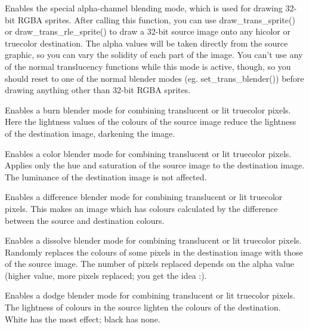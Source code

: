 Enables the special alpha-channel blending mode, which is used for drawing 32-bit RGBA sprites. After calling this function, you can use draw_trans_sprite() or draw_trans_rle_sprite() to draw a 32-bit source image onto any hicolor or truecolor destination. The alpha values will be taken directly from the source graphic, so you can vary the solidity of each part of the image. You can't use any of the normal translucency functions while this mode is active, though, so you should reset to one of the normal blender modes (eg. set_trans_blender()) before drawing anything other than 32-bit RGBA sprites.


Enables a burn blender mode for combining translucent or lit truecolor pixels.  Here the lightness values of the colours of the source image reduce the lightness of the destination image, darkening the image.


Enables a color blender mode for combining translucent or lit truecolor pixels.
Applies only the hue and saturation of the source image to the destination
image. The luminance of the destination image is not affected.


Enables a difference blender mode for combining translucent or lit truecolor
pixels. This makes an image which has colours calculated by the difference
between the source and destination colours.


Enables a dissolve blender mode for combining translucent or lit truecolor
pixels. Randomly replaces the colours of some pixels in the destination image
with those of the source image. The number of pixels replaced depends on the
alpha value (higher value, more pixels replaced; you get the idea :).


Enables a dodge blender mode for combining translucent or lit truecolor pixels.
The lightness of colours in the source lighten the colours of the destination.
White has the most effect; black has none.

